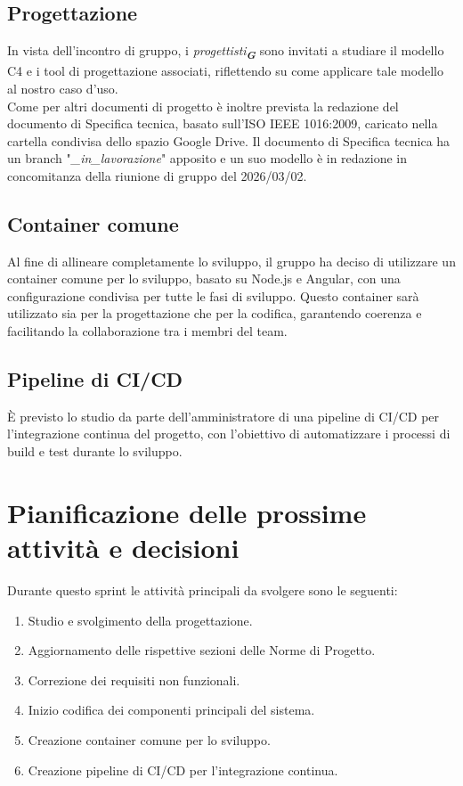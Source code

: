 \documentclass[a4paper,12pt]{article}
\newcommand{\glossario}[1]{\textit{#1}\textsubscript{\textbf{\textit{\textcolor{lightblack}{G}}}}}
\begin{document}
\subsection{Progettazione}
In vista dell'incontro di gruppo, i \glossario{progettisti} sono invitati a studiare il modello C4 e i tool di progettazione associati, riflettendo su come applicare tale modello al nostro caso d'uso.\\
Come per altri documenti di progetto è inoltre prevista la redazione del documento di Specifica tecnica, basato sull'ISO IEEE 1016:2009, caricato nella cartella condivisa dello spazio Google Drive. Il documento di Specifica tecnica ha un branch "\textit{\_in\_lavorazione}" apposito e un suo modello è in redazione in concomitanza della riunione di gruppo del 2026/03/02.

\subsection{Container comune}
Al fine di allineare completamente lo sviluppo, il gruppo ha deciso di utilizzare un container comune per lo sviluppo, basato su Node.js e Angular, con una configurazione condivisa per tutte le fasi di sviluppo. Questo container sarà utilizzato sia per la progettazione che per la codifica, garantendo coerenza e facilitando la collaborazione tra i membri del team.

\subsection{Pipeline di CI/CD}
È previsto lo studio da parte dell'amministratore di una pipeline di CI/CD per l'integrazione continua del progetto, con l'obiettivo di automatizzare i processi di build e test durante lo sviluppo.

\section{Pianificazione delle prossime attività e decisioni}
Durante questo sprint le attività principali da svolgere sono le seguenti:
\begin{enumerate}[noitemsep]
    \item Studio e svolgimento della progettazione.
    \item Aggiornamento delle rispettive sezioni delle Norme di Progetto.
    \item Correzione dei requisiti non funzionali.
    \item Inizio codifica dei componenti principali del sistema.
    \item Creazione container comune per lo sviluppo.
    \item Creazione pipeline di CI/CD per l'integrazione continua.
\end{enumerate}
\end{document}
